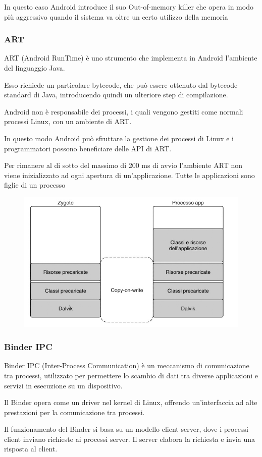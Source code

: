 \spacer
In questo caso Android introduce il suo Out-of-memory killer che opera in modo più aggressivo quando il sistema va oltre un certo utilizzo della memoria

\subsubsection{ART}
ART (Android RunTime) è uno strumento che implementa in Android l'ambiente del linguaggio Java.

Esso richiede un particolare bytecode, che può essere ottenuto dal bytecode standard di Java, introducendo quindi un ulteriore step di compilazione.

\spacer
Android non è responsabile dei processi, i quali vengono gestiti come normali processi Linux, con un ambiente di ART.

In questo modo Android può sfruttare la gestione dei processi di Linux e i programmatori possono beneficiare delle API di ART.

\spacer
Per rimanere al di sotto del massimo di 200 ms di avvio l'ambiente ART non viene inizializzato ad ogni apertura di un'applicazione. Tutte le applicazioni sono figlie di un processo

\begin{figure}[H]
    \centering
    \includegraphics[width=0.5\linewidth]{assets/android-art.jpeg}
\end{figure}

\subsubsection{Binder IPC}
Binder IPC (Inter-Process Communication) è un meccanismo di comunicazione tra processi, utilizzato per permettere lo scambio di dati tra diverse applicazioni e servizi in esecuzione su un dispositivo.

Il Binder opera come un driver nel kernel di Linux, offrendo un'interfaccia ad alte prestazioni per la comunicazione tra processi.

\spacer
Il funzionamento del Binder si basa su un modello client-server, dove i processi client inviano richieste ai processi server. Il server elabora la richiesta e invia una risposta al client.

